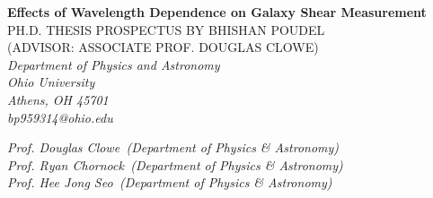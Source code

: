 \documentclass[12pt, preprint,letterpaper]{article}
\begin{document}
%
%
%
\thispagestyle{empty}
\begin{center}
\textbf{Effects of Wavelength Dependence on Galaxy Shear Measurement} \\

\vspace{2cm}
PH.D. THESIS PROSPECTUS BY BHISHAN POUDEL \\
(ADVISOR: ASSOCIATE PROF. DOUGLAS CLOWE) \\

\vspace{3cm}
\it{
Department of Physics and Astronomy\\
Ohio University\\
Athens, OH 45701\\
\vspace{2cm}
bp959314@ohio.edu\\
}


\vspace{3cm}
\it{
Prof. Douglas Clowe\,  \hspace{2mm} (Department of Physics \& Astronomy)\\
Prof. Ryan Chornock\,  \hspace{2mm} (Department of Physics \& Astronomy)\\
Prof. Hee Jong Seo\, \hspace{3mm} (Department of Physics \& Astronomy)
}

\end{center}
%
%
%
%
\clearpage
\tableofcontents
\listoffigures
\listoftables
\clearpage{}
%
%
\end{document}
